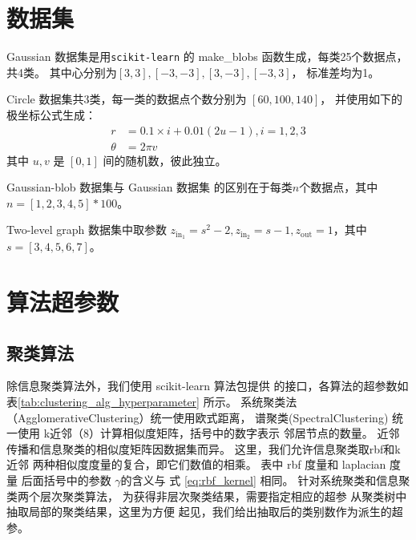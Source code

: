 \section{数据集}
Gaussian 数据集是用\texttt{scikit-learn}
\cite{scikit-learn}
的 make\_blobs 函数生成，每类25个数据点，共4类。
其中心分别为$[3,3],[-3,-3],[3,-3],[-3,3]$，
标准差均为1。

Circle 数据集共3类，每一类的数据点个数分别为 $[60,100,140]$，
并使用如下的极坐标公式生成：
\begin{align*}
r &= 0.1 \times i + 0.01(2u-1), i = 1, 2, 3\\
\theta & = 2\pi v
\end{align*}
其中 $u,v$ 是 $[0,1]$ 间的随机数，彼此独立。

Gaussian-blob 数据集与 Gaussian 数据集
的区别在于每类$n$个数据点，其中$n=[1,2,3,4,5]*100$。

Two-level graph 数据集中取参数
$z_{\mathrm{in}_1}=s^2-2,
z_{\mathrm{in}_2}=s-1,
z_{\mathrm{out}}=1$，其中$s=[3,4,5,6,7]$。

\section{算法超参数}
\subsection{聚类算法}
除信息聚类算法外，我们使用 scikit-learn 算法包提供
的接口，各算法的超参数如表\ref{tab:clustering_alg_hyperparameter}
所示。
系统聚类法（AgglomerativeClustering）统一使用欧式距离，
谱聚类(SpectralClustering)
统一使用 k近邻（8）计算相似度矩阵，括号中的数字表示
邻居节点的数量。
近邻传播和信息聚类的相似度矩阵因数据集而异。
这里，我们允许信息聚类取rbf和k近邻
两种相似度度量的复合，即它们数值的相乘。
表中 rbf 度量和 laplacian 度量
后面括号中的参数 $\gamma$的含义与
式 \ref{eq:rbf_kernel} 相同。
针对系统聚类和信息聚类两个层次聚类算法，
为获得非层次聚类结果，需要指定相应的超参
从聚类树中抽取局部的聚类结果，这里为方便
起见，我们给出抽取后的类别数作为派生的超参。

